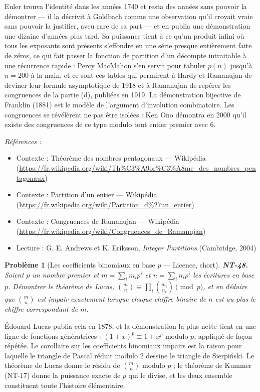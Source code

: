 \documentclass[11pt]{article}
\newtheorem{problem}{Problème}
\newenvironment{refs}{\par\small\noindent\emph{Références :}\begin{itemize}\setlength\itemsep{0pt}}{\end{itemize}\normalsize}
\begin{document}
\noindent Euler trouva l'identité dans les années 1740 et resta des années sans pouvoir la
démontrer --- il la décrivit à Goldbach comme une observation qu'il croyait vraie sans pouvoir la
justifier, aveu rare de sa part --- et en publia une démonstration une dizaine d'années plus tard. Sa
puissance tient à ce qu'un produit infini où tous les exposants sont présents s'effondre en une série
presque entièrement faite de zéros, ce qui fait passer la fonction de partition d'un décompte
intraitable à une récurrence rapide : Percy MacMahon s'en servit pour tabuler $ p(n) $ jusqu'à
$ n = 200 $ à la main, et ce sont ces tables qui permirent à Hardy et Ramanujan de deviner leur
formule asymptotique de 1918 et à Ramanujan de repérer les congruences de la partie (d), publiées en
1919. La démonstration bijective de Franklin (1881) est le modèle de l'argument d'involution
combinatoire. Les congruences se révélèrent ne pas être isolées : Ken Ono démontra en 2000 qu'il
existe des congruences de ce type modulo tout entier premier avec $ 6 $.

\begin{refs}
\item Contexte : Théorème des nombres pentagonaux --- Wikipédia (\url{https://fr.wikipedia.org/wiki/Th%C3%A9or%C3%A8me_des_nombres_pentagonaux})
\item Contexte : Partition d'un entier --- Wikipédia (\url{https://fr.wikipedia.org/wiki/Partition_d%27un_entier})
\item Contexte : Congruences de Ramanujan --- Wikipédia (\url{https://fr.wikipedia.org/wiki/Congruences_de_Ramanujan})
\item Lecture : G. E. Andrews et K. Eriksson, \textit{Integer Partitions} (Cambridge, 2004)
\end{refs}

\bigskip

\begin{problem}[{Les coefficients binomiaux en base $ p $ --- Licence, short}]
\textbf{NT-48.} Soient $ p $ un nombre premier et $ m = \sum_i m_i p^i $
et $ n = \sum_i n_i p^i $ les écritures en base $ p $. Démontrer le théorème de Lucas,
$ \binom{m}{n} \equiv \prod_i \binom{m_i}{n_i} \pmod p $, et en déduire que $ \binom{m}{n} $
est impair exactement lorsque chaque chiffre binaire de $ n $ est au plus le chiffre correspondant
de $ m $.
\end{problem}

\noindent Édouard Lucas publia cela en 1878, et la démonstration la plus nette tient en une
ligne de fonctions génératrices : $ (1+x)^{p} \equiv 1 + x^{p} $ modulo $ p $, appliqué de façon
répétée. Le corollaire sur les coefficients binomiaux impairs est la raison pour laquelle le triangle
de Pascal réduit modulo $ 2 $ dessine le triangle de Sierpi\'nski. Le théorème de Lucas donne le
résidu de $ \binom{m}{n} $ modulo $ p $ ; le théorème de Kummer (NT-17) donne la puissance exacte
de $ p $ qui le divise, et les deux ensemble constituent toute l'histoire élémentaire.
\end{document}
